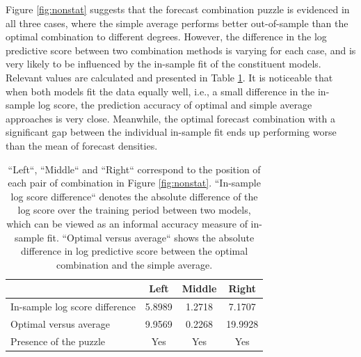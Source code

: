 \documentclass{monashthesis}
\begin{document}
Figure \ref{fig:nonstat} suggests that the forecast combination puzzle is evidenced in all three cases, where the simple average performs better out-of-sample than the optimal combination to different degrees. However, the difference in the log predictive score between two combination methods is varying for each case, and is very likely to be influenced by the in-sample fit of the constituent models. Relevant values are calculated and presented in Table \ref{tab:comparison1}. It is noticeable that when both models fit the data equally well, i.e., a small difference in the in-sample log score, the prediction accuracy of optimal and simple average approaches is very close. Meanwhile, the optimal forecast combination with a significant gap between the individual in-sample fit ends up performing worse than the mean of forecast densities.

\begin{table}[ht]
  \centering
    \begin{tabular}{l|ccc}
    \toprule
                                      &    Left     &   Middle    &    Right   \\
    \midrule
    In-sample log score difference    &   5.8989    &   1.2718    &   7.1707   \\
    Optimal versus average            &   9.9569    &   0.2268    &  19.9928   \\
    Presence of the puzzle            &   Yes       &   Yes       &   Yes      \\
    \bottomrule
    \end{tabular}
  \caption{``Left``, ``Middle`` and ``Right`` correspond to the position of each pair of combination in Figure \ref{fig:nonstat}. ``In-sample log score difference`` denotes the absolute difference of the log score over the training period between two models, which can be viewed as an informal accuracy measure of in-sample fit. ``Optimal versus average`` shows the absolute difference in log predictive score between the optimal combination and the simple average.}
  \label{tab:comparison1}
\end{table}
\end{document}
